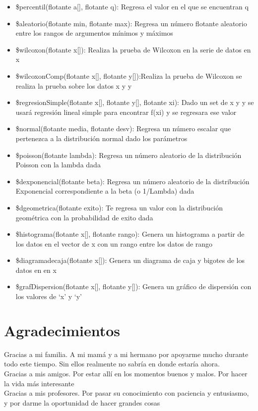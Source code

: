 \documentclass[
10pt, %
a4paper, %
oneside, %
headinclude,footinclude, %
BCOR5mm, %
]{scrartcl}
\begin{document}
\begin{itemize}
    \item  \$percentil(flotante a[], flotante q): Regresa el valor en el que se encuentran q%
    \item  \$aleatorio(flotante min, flotante max): Regresa un número flotante aleatorio entre los rangos de argumentos mínimos y máximos
    \item  \$wilcoxon(flotante x[]): Realiza la prueba de Wilcoxon en la serie de datos en x
    \item  \$wilcoxonComp(flotante x[], flotante y[]):Realiza la prueba de Wilcoxon se realiza la prueba sobre los datos x y y
    \item  \$regresionSimple(flotante x[], flotante y[], flotante xi): Dado un set de x y y se usará regresión lineal simple para encontrar f(xi) y se regresara ese valor
    \item  \$normal(flotante media, flotante desv): Regresa un número escalar que pertenezca a la distribución normal dado los parámetros
    \item  \$poisson(flotante lambda): Regresa un número aleatorio de la distribución Poisson con la lambda dada
    \item  \$dexponencial(flotante beta): Regresa un número aleatorio de la distribución Exponencial correspondiente a la beta (o 1/Lambda) dada
    \item  \$dgeometrica(flotante exito): Te regresa un valor con la distribución geométrica con la probabilidad de exito dada
    \item  \$histograma(flotante x[], flotante rango): Genera un histograma a partir de los datos en el vector de x con un rango entre los datos de rango
    \item  \$diagramadecaja(flotante x[]): Genera un diagrama de caja y bigotes de los datos en en x
    \item  \$grafDispersion(flotante x[], flotante y[]): Genera un gráfico de dispersión con los valores de ‘x’ y ‘y’

\end{itemize}

\section{Agradecimientos}

Gracias a mi familia. A mi mamá y a mi hermano por apoyarme mucho durante todo este tiempo. Sin ellos realmente no sabría en donde estaría ahora.\\
Gracias a mis amigos. Por estar allí en los momentos buenos y malos. Por hacer la vida más interesante\\
Gracias a mis profesores. Por pasar su conocimiento con paciencia y entusiasmo, y por darme la oportunidad de hacer grandes cosas\\
\end{document}
